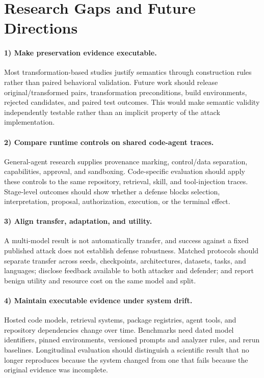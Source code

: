 \documentclass[acmsmall,screen,review]{acmart}
\begin{document}

\section{Research Gaps and Future Directions} \label{sec:open}

\paragraph{1) Make preservation evidence executable.}
Most transformation-based studies justify semantics through construction rules rather than paired behavioral validation. Future work should release original/transformed pairs, transformation preconditions, build environments, rejected candidates, and paired test outcomes. This would make semantic validity independently testable rather than an implicit property of the attack implementation.

\paragraph{2) Compare runtime controls on shared code-agent traces.}
General-agent research supplies provenance marking, control/data separation, capabilities, approval, and sandboxing. Code-specific evaluation should apply these controls to the same repository, retrieval, skill, and tool-injection traces. Stage-level outcomes should show whether a defense blocks selection, interpretation, proposal, authorization, execution, or the terminal effect.

\paragraph{3) Align transfer, adaptation, and utility.}
A multi-model result is not automatically transfer, and success against a fixed published attack does not establish defense robustness. Matched protocols should separate transfer across seeds, checkpoints, architectures, datasets, tasks, and languages; disclose feedback available to both attacker and defender; and report benign utility and resource cost on the same model and split.

\paragraph{4) Maintain executable evidence under system drift.}
Hosted code models, retrieval systems, package registries, agent tools, and repository dependencies change over time. Benchmarks need dated model identifiers, pinned environments, versioned prompts and analyzer rules, and rerun baselines. Longitudinal evaluation should distinguish a scientific result that no longer reproduces because the system changed from one that fails because the original evidence was incomplete.
\end{document}
